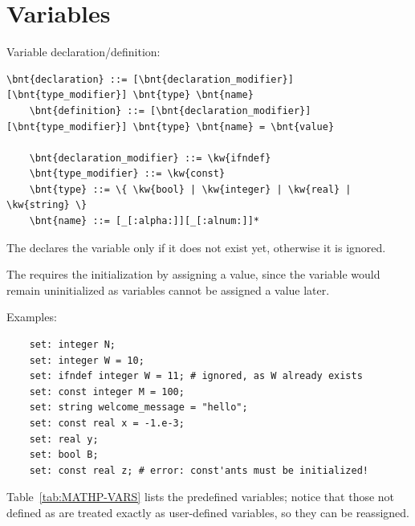 \section{Variables}
\label{sec:variables}
Variable declaration/definition:
\begin{Verbatim}[commandchars=\\\{\}]
    \bnt{declaration} ::= [\bnt{declaration_modifier}] [\bnt{type_modifier}] \bnt{type} \bnt{name}
    \bnt{definition} ::= [\bnt{declaration_modifier}] [\bnt{type_modifier}] \bnt{type} \bnt{name} = \bnt{value}

    \bnt{declaration_modifier} ::= \kw{ifndef}
    \bnt{type_modifier} ::= \kw{const}
    \bnt{type} ::= \{ \kw{bool} | \kw{integer} | \kw{real} | \kw{string} \}
    \bnt{name} ::= [_[:alpha:]][_[:alnum:]]*
\end{Verbatim}
The   declares the variable only if it does not exist yet,
otherwise it is ignored.

The   requires the initialization by assigning a value,
since the variable would remain uninitialized as  variables cannot be assigned
a value later.

Examples:
\begin{verbatim}
    set: integer N;
    set: integer W = 10;
    set: ifndef integer W = 11; # ignored, as W already exists
    set: const integer M = 100;
    set: string welcome_message = "hello";
    set: const real x = -1.e-3;
    set: real y;
    set: bool B;
    set: const real z; # error: const'ants must be initialized!
\end{verbatim}

Table~\ref{tab:MATHP-VARS} lists the predefined variables; notice
that those not defined as  are treated exactly as user-defined variables, so they 
can be reassigned.

